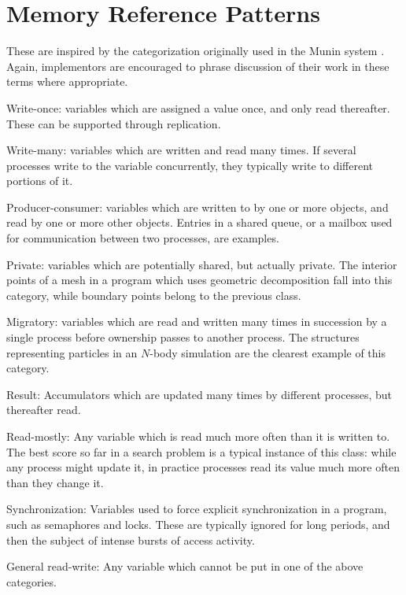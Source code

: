 \section{Memory Reference Patterns\label{s:memory}}

These are inspired by the categorization originally used in the Munin system \cite{b:munin-overview}.
Again, implementors are encouraged to phrase discussion of their work in these terms where appropriate.

\begin{itemlist}
\item	Write-once:
	variables which are assigned a value once, and only read thereafter.
	These can be supported through replication.
\item	Write-many:
	variables which are written and read many times.
	If several processes write to the variable concurrently, they typically write to different portions of it.
\item	Producer-consumer:
	variables which are written to by one or more objects, and read by one or more other objects.
	Entries in a shared queue, or a mailbox used for communication between two processes, are examples.
\item	Private:
	variables which are potentially shared, but actually private.
	The interior points of a mesh in a program which uses geometric decomposition fall into this category,
	while boundary points belong to the previous class.
\item	Migratory:
	variables which are read and written many times in succession by a single process before ownership passes to another process.
	The structures representing particles in an $N$-body simulation are the clearest example of this category.
\item	Result:
	Accumulators which are updated many times by different processes, but thereafter read.
\item	Read-mostly:
	Any variable which is read much more often than it is written to.
	The best score so far in a search problem is a typical instance of this class:
	while any process might update it, in practice processes read its value much more often than they change it.
\item	Synchronization:
	Variables used to force explicit synchronization in a program, such as semaphores and locks.
	These are typically ignored for long periods, and then the subject of intense bursts of access activity.
\item	General read-write:
	Any variable which cannot be put in one of the above categories.
\end{itemlist}
